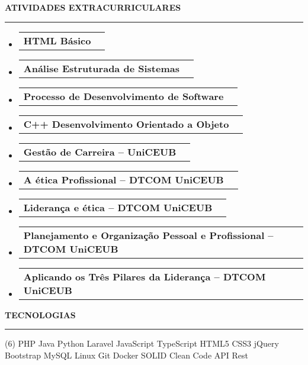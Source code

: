 \documentclass[a4paper,10pt]{article}
\makeatletter
\newcommand{\ProjectItem}[2]{
    \item
        \begin{tabular*}{0.93\textwidth}[t]{l@{\extracolsep{\fill}}r}
            \textbf{#1} & \footnotesize#2
        \end{tabular*}
}
\newcommand{\SectionTitle}[1]{
    \begin{flushleft}
    \textbf{#1}
    \noindent\textcolor{gray}{\rule{18.5cm}{1px}}
    \end{flushleft}
}
\newcommand{\SectionBegin}[0]{
    \vspace{-16pt}\begin{flushleft}
    \begin{itemize}
}
\newcommand{\SectionEnd}[0]{
    \end{itemize}
    \end{flushleft}\vspace{-2pt}
}
\makeatother
\begin{document}
\SectionTitle
    {ATIVIDADES EXTRACURRICULARES}
\SectionBegin
    \ProjectItem{HTML Básico}{}
    \ProjectItem{Análise Estruturada de Sistemas}{}
    \ProjectItem{Processo de Desenvolvimento de Software}{}
    \ProjectItem{C++ Desenvolvimento Orientado a Objeto}{}
    \ProjectItem{Gestão de Carreira – UniCEUB}{}
    \ProjectItem{A ética Profissional – DTCOM UniCEUB}{}
    \ProjectItem{Liderança e ética – DTCOM UniCEUB}{}
    \ProjectItem{Planejamento e Organização Pessoal e Profissional – DTCOM UniCEUB}{}
    \ProjectItem{Aplicando os Três Pilares da Liderança – DTCOM UniCEUB}{}
\SectionEnd
    
\SectionTitle
    {TECNOLOGIAS}
\begin{tasks}[style=itemize, column-sep=-13mm, label-align=left, label-offset={0mm}](6)%
\task PHP
\task Java
\task Python
\task Laravel
\task JavaScript
\task TypeScript
\task HTML5
\task CSS3
\task jQuery
\task Bootstrap
\task MySQL
\task Linux
\task Git
\task Docker
\task SOLID
\task Clean Code
\task API Rest
\end{tasks}
\end{document}
